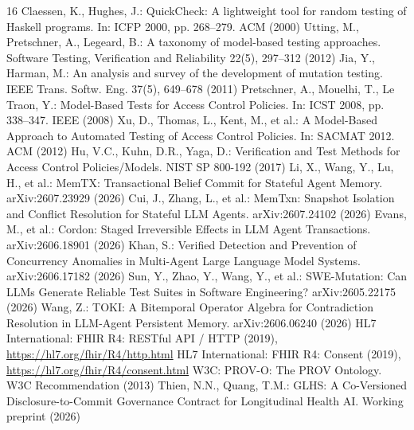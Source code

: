 \documentclass[11pt]{article}
\begin{document}
\begin{thebibliography}{16}
 Claessen, K., Hughes, J.: QuickCheck: A lightweight tool for random testing of Haskell programs. In: ICFP 2000, pp. 268--279. ACM (2000)
 Utting, M., Pretschner, A., Legeard, B.: A taxonomy of model-based testing approaches. Software Testing, Verification and Reliability 22(5), 297--312 (2012)
 Jia, Y., Harman, M.: An analysis and survey of the development of mutation testing. IEEE Trans. Softw. Eng. 37(5), 649--678 (2011)
 Pretschner, A., Mouelhi, T., Le Traon, Y.: Model-Based Tests for Access Control Policies. In: ICST 2008, pp. 338--347. IEEE (2008)
 Xu, D., Thomas, L., Kent, M., et al.: A Model-Based Approach to Automated Testing of Access Control Policies. In: SACMAT 2012. ACM (2012)
 Hu, V.C., Kuhn, D.R., Yaga, D.: Verification and Test Methods for Access Control Policies/Models. NIST SP 800-192 (2017)
 Li, X., Wang, Y., Lu, H., et al.: MemTX: Transactional Belief Commit for Stateful Agent Memory. arXiv:2607.23929 (2026)
 Cui, J., Zhang, L., et al.: MemTxn: Snapshot Isolation and Conflict Resolution for Stateful LLM Agents. arXiv:2607.24102 (2026)
 Evans, M., et al.: Cordon: Staged Irreversible Effects in LLM Agent Transactions. arXiv:2606.18901 (2026)
 Khan, S.: Verified Detection and Prevention of Concurrency Anomalies in Multi-Agent Large Language Model Systems. arXiv:2606.17182 (2026)
 Sun, Y., Zhao, Y., Wang, Y., et al.: SWE-Mutation: Can LLMs Generate Reliable Test Suites in Software Engineering? arXiv:2605.22175 (2026)
 Wang, Z.: TOKI: A Bitemporal Operator Algebra for Contradiction Resolution in LLM-Agent Persistent Memory. arXiv:2606.06240 (2026)
 HL7 International: FHIR R4: RESTful API / HTTP (2019), \url{https://hl7.org/fhir/R4/http.html}
 HL7 International: FHIR R4: Consent (2019), \url{https://hl7.org/fhir/R4/consent.html}
 W3C: PROV-O: The PROV Ontology. W3C Recommendation (2013)
 Thien, N.N., Quang, T.M.: GLHS: A Co-Versioned Disclosure-to-Commit Governance Contract for Longitudinal Health AI. Working preprint (2026)
\end{thebibliography}
\end{document}
